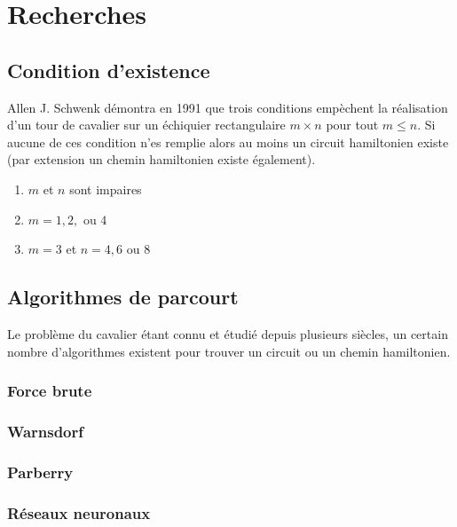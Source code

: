 \section{Recherches}
\subsection{Condition d'existence}
Allen J. Schwenk démontra en 1991 que trois conditions empèchent la réalisation d'un tour de cavalier sur un échiquier rectangulaire $m \times n$  pour tout $m \leq n$. Si aucune de ces condition n'es remplie alors au moins un circuit hamiltonien existe (par extension un chemin hamiltonien existe également).
\begin{enumerate}
\item $m$ et $n$ sont impaires
\item $m = 1,2,$ ou $4$
\item $m = 3$ et $n = 4,6$ ou $8$
\end{enumerate}

\subsection{Algorithmes de parcourt}
Le problème du cavalier étant connu et étudié depuis plusieurs siècles, un certain nombre d'algorithmes existent pour trouver un circuit ou un chemin hamiltonien.

\subsubsection{Force brute}
\subsubsection{Warnsdorf}
\subsubsection{Parberry}
\subsubsection{Réseaux neuronaux}